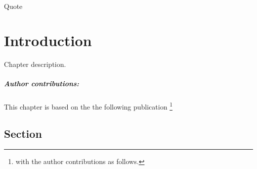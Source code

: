 \begin{savequote}[8cm]
    Quote
\end{savequote}
    
\chapter{\label{intro}Introduction} 

Chapter description.
\small\paragraph{Author contributions:} This chapter is based on the the following publication \footnote{with the author contributions as follows.} \par\vspace{1em}

\minitoc

\clearpage

\section{Section}

    \blindtext